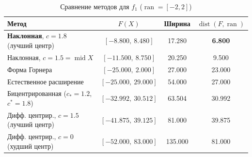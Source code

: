 \documentclass[12pt,a4paper]{article}
\newcommand{\ran}{\operatorname{ran}}
\newcommand{\Mid}{\operatorname{mid}}
\newcommand{\dist}{\operatorname{dist}}
\begin{document}
\begin{table}[H]
\centering
\begin{tabular}{|l|c|c|c|}
\hline
Метод & $F(X)$ & Ширина & $\dist(F,\ran)$ \\
\hline
\textbf{Наклонная}, $c=1.8$ (лучший центр) & $[-8.800,\ 8.480]$ & 17.280 & \textbf{6.800} \\
Наклонная, $c=1.5=\Mid X$ & $[-11.500,\ 8.750]$ & 20.250 & 9.500 \\
Форма Горнера & $[-25.000,\ 2.000]$ & 27.000 & 23.000 \\
Естественное расширение & $[-25.000,\ 29.000]$ & 54.000 & 27.000 \\
Бицентрированная ($c_{*}=1.2$, $c^{*}=1.8$) & $[-32.992,\ 30.512]$ & 63.504 & 30.992 \\
Дифф. центрир., $c=1.5$ (лучший центр) & $[-41.875,\ 39.125]$ & 81.000 & 39.875 \\
Дифф. центрир., $c=0$ (худший центр) & $[-52.000,\ 83.000]$ & 135.000 & 81.000 \\
\hline
\end{tabular}
\caption{Сравнение методов для $f_1$ ($\ran=[-2,2]$)}
\label{tab:f1}
\end{table}
\end{document}
